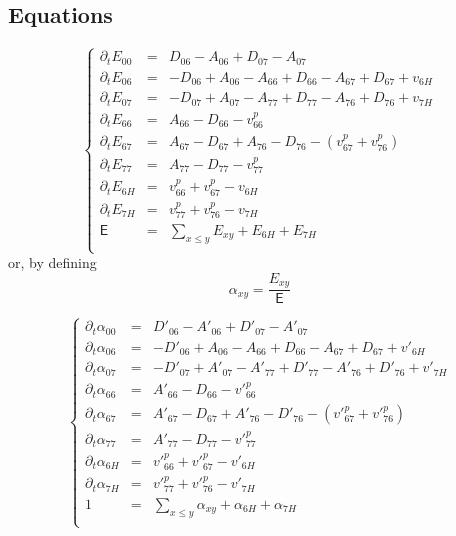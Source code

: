 \documentclass[aps,onecolumn,11pt]{revtex4}
\begin{document}
\subsection{Equations}
\begin{equation}
\left\lbrace
\begin{array}{rcl}
\partial_t E_{00} & = & D_{06}-A_{06} + D_{07}-A_{07}\\
\partial_t E_{06} & = & -D_{06}+A_{06} - A_{66} + D_{66} - A_{67} + D_{67} + v_{6H}\\
\partial_t E_{07} & = & -D_{07}+A_{07} - A_{77} + D_{77} - A_{76} + D_{76} + v_{7H}\\
\partial_t E_{66} & = & A_{66}-D_{66} -v^p_{66}\\
\partial_t E_{67} & = & A_{67}-D_{67} + A_{76}-D_{76} - (v^p_{67}+v^p_{76})\\
\partial_t E_{77} & = & A_{77}-D_{77} - v^p_{77}\\
\partial_t E_{6H} & = & v^p_{66}+v^p_{67} - v_{6H}\\
\partial_t E_{7H} & = & v^p_{77}+v^p_{76} - v_{7H}\\
\mathsf{E}      & = & {\displaystyle \sum_{x\leq y} E_{xy}}+E_{6H}+E_{7H}\\
\end{array}
\right.
\end{equation}
or, by defining
\begin{equation}
	\alpha_{xy} = \dfrac{E_{xy}}{\mathsf{E}}
\end{equation}

\begin{equation}
\left\lbrace
\begin{array}{rcl}
\partial_t \alpha_{00} & = & D'_{06}-A'_{06} + D'_{07}-A'_{07}\\
\partial_t \alpha_{06} & = & -D'_{06}+A_{06} - A_{66} + D_{66} - A_{67} + D_{67} + v'_{6H}\\
\partial_t \alpha_{07} & = & -D'_{07}+A'_{07} - A'_{77} + D'_{77} - A'_{76} + D'_{76} + v'_{7H}\\
\partial_t \alpha_{66} & = & A'_{66}-D_{66} -v'^p_{66}\\
\partial_t \alpha_{67} & = & A'_{67}-D_{67} + A'_{76}-D'_{76} - (v'^p_{67}+v'^p_{76})\\
\partial_t \alpha_{77} & = & A'_{77}-D_{77} - v'^p_{77}\\
\partial_t \alpha_{6H} & = & v'^p_{66}+v'^p_{67} - v'_{6H}\\
\partial_t \alpha_{7H} & = & v'^p_{77}+v'^p_{76} - v'_{7H}\\
1      & = & {\displaystyle \sum_{x\leq y} \alpha_{xy}}+\alpha_{6H}+\alpha_{7H}\\
\end{array}
\right.
\end{equation}
\end{document}
